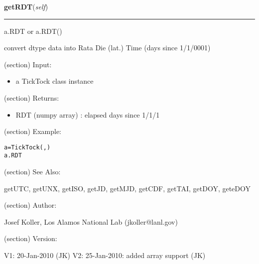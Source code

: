     \label{spacepy:spacetime:TickTock:getRDT}

    \vspace{0.5ex}

\hspace{.8\funcindent}\begin{boxedminipage}{\funcwidth}

    \raggedright \textbf{getRDT}(\textit{self})

    \vspace{-1.5ex}

    \rule{\textwidth}{0.5\fboxrule}
\setlength{\parskip}{2ex}
    a.RDT or a.RDT()

    convert dtype data into Rata Die (lat.) Time (days since 1/1/0001)

    (section) Input:

      \begin{itemize}
      \setlength{\parskip}{0.6ex}
        \item a TickTock class instance

      \end{itemize}

    (section) Returns:

      \begin{itemize}
      \setlength{\parskip}{0.6ex}
        \item RDT (numpy array) : elapsed days since 1/1/1

      \end{itemize}

    (section) Example:

\begin{alltt}
\pysrcprompt{{\textgreater}{\textgreater}{\textgreater} }a = TickTock(, )
\pysrcprompt{{\textgreater}{\textgreater}{\textgreater} }a.RDT
\end{alltt}
    (section) See Also:

      getUTC, getUNX, getISO, getJD, getMJD, getCDF, getTAI, getDOY, 
      geteDOY

    (section) Author:

      Josef Koller, Los Alamos National Lab (jkoller@lanl.gov)

    (section) Version:

      V1: 20-Jan-2010 (JK) V2: 25-Jan-2010: added array support (JK)

\setlength{\parskip}{1ex}
    \end{boxedminipage}

